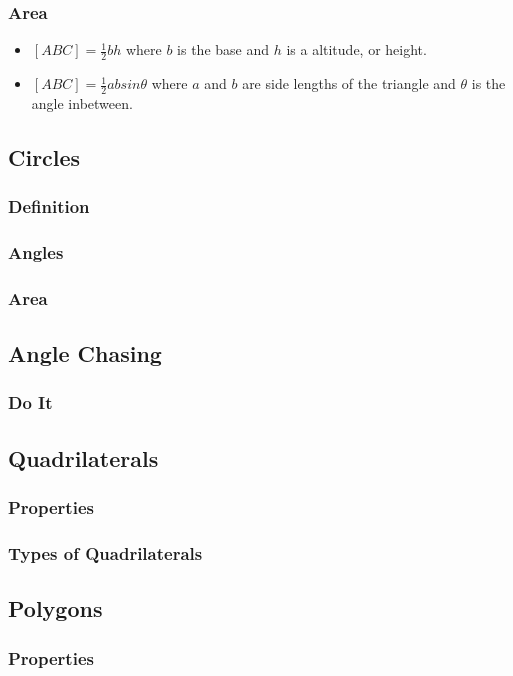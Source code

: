 \documentclass[11pt]{article}
\begin{document}
\subsubsection*{Area}
\begin{itemize}
    \item $[ABC]=\frac{1}{2}bh$ where $b$ is the base and $h$ is a altitude, or height.
    \item $[ABC]=\frac{1}{2}ab sin \theta$ where $a$ and $b$ are side lengths of the triangle and $\theta$ is the angle inbetween.
\end{itemize}
\subsection{Circles}

\subsubsection*{Definition}
\subsubsection*{Angles}
\subsubsection*{Area}
\subsection{Angle Chasing}
\subsubsection*{Do It}
\subsection{Quadrilaterals} 
\subsubsection*{Properties}
\subsubsection*{Types of Quadrilaterals}
\subsection{Polygons}
\subsubsection*{Properties}
\end{document}
